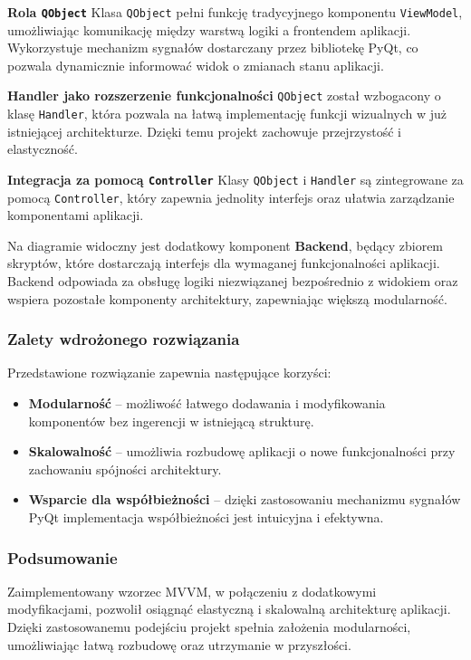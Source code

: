 \textbf{Rola \texttt{QObject}}
Klasa \texttt{QObject} pełni funkcję tradycyjnego komponentu \texttt{ViewModel}, umożliwiając komunikację między warstwą logiki a frontendem aplikacji. Wykorzystuje mechanizm sygnałów dostarczany przez bibliotekę PyQt, co pozwala dynamicznie informować widok o zmianach stanu aplikacji.

\textbf{Handler jako rozszerzenie funkcjonalności}
\texttt{QObject} został wzbogacony o klasę \texttt{Handler}, która pozwala na łatwą implementację funkcji wizualnych w już istniejącej architekturze. Dzięki temu projekt zachowuje przejrzystość i elastyczność.

\textbf{Integracja za pomocą \texttt{Controller}}
Klasy \texttt{QObject} i \texttt{Handler} są zintegrowane za pomocą \texttt{Controller}, który zapewnia jednolity interfejs oraz ułatwia zarządzanie komponentami aplikacji.

Na diagramie widoczny jest dodatkowy komponent \textbf{Backend}, będący zbiorem skryptów, które dostarczają interfejs dla wymaganej funkcjonalności aplikacji. Backend odpowiada za obsługę logiki niezwiązanej bezpośrednio z widokiem oraz wspiera pozostałe komponenty architektury, zapewniając większą modularność.

\subsubsection{Zalety wdrożonego rozwiązania}
Przedstawione rozwiązanie zapewnia następujące korzyści:
\begin{itemize}
    \item \textbf{Modularność} -- możliwość łatwego dodawania i modyfikowania komponentów bez ingerencji w istniejącą strukturę.
    \item \textbf{Skalowalność} -- umożliwia rozbudowę aplikacji o nowe funkcjonalności przy zachowaniu spójności architektury.
    \item \textbf{Wsparcie dla współbieżności} -- dzięki zastosowaniu mechanizmu sygnałów PyQt implementacja współbieżności jest intuicyjna i efektywna.
\end{itemize}

\subsubsection{Podsumowanie}
Zaimplementowany wzorzec MVVM, w połączeniu z dodatkowymi modyfikacjami, pozwolił osiągnąć elastyczną i skalowalną architekturę aplikacji. Dzięki zastosowanemu podejściu projekt spełnia założenia modularności, umożliwiając łatwą rozbudowę oraz utrzymanie w przyszłości.